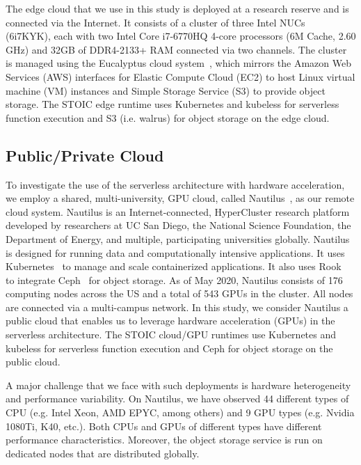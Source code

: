 The edge cloud that we use in this study is deployed at a research reserve and is connected via the Internet.  It consists of a cluster of three Intel NUCs~\cite{ref:nucs} (6i7KYK), each with two Intel Core i7-6770HQ 4-core processors (6M Cache, 2.60 GHz) and 32GB of DDR4-2133+ RAM connected via two channels. The cluster is managed using the Eucalyptus cloud system~\cite{ref:euca}, which mirrors the Amazon Web Services (AWS) interfaces for Elastic Compute Cloud (EC2) to host Linux virtual machine (VM) instances and Simple Storage Service (S3) to provide object storage. The STOIC edge runtime uses Kubernetes and kubeless for serverless function execution and S3 (i.e. walrus) for object storage on the edge cloud.
 
\subsection{Public/Private Cloud}

To investigate the use of the serverless architecture with hardware acceleration, we employ a shared, multi-university, GPU cloud, called Nautilus~\cite{ref:nautilus}, as our remote cloud system. Nautilus is an Internet-connected, HyperCluster research platform developed by researchers at UC San Diego, the National Science Foundation, the Department of Energy, and multiple, participating universities globally.  Nautilus is designed for running data and computationally intensive applications. It uses Kubernetes~\cite{ref:k8s} to manage and scale containerized applications. It also uses Rook~\cite{ref:rook} to integrate Ceph~\cite{ref:ceph} for object storage. As of May 2020, Nautilus consists of 176 computing nodes across the US and a total of 543 GPUs in the cluster. All nodes are connected via a multi-campus network. In this study, we consider Nautilus a public cloud that enables us to leverage hardware acceleration (GPUs) in the serverless architecture. The STOIC cloud/GPU runtimes use Kubernetes and kubeless for serverless function execution and Ceph for object storage on the public cloud.

A major challenge that we face with such deployments is hardware heterogeneity and performance variability. On Nautilus, we have observed 44 different types of CPU (e.g. Intel Xeon, AMD EPYC, among others) and 9 GPU types (e.g. Nvidia 1080Ti, K40, etc.). Both CPUs and GPUs of different types have different performance characteristics. Moreover, the object storage service is run on dedicated nodes that are distributed globally.

